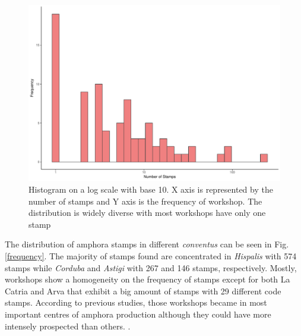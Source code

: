 \documentclass[review]{elsarticle}
\newcommand{\memo}[2]{\textcolor{#1}{#2}}
\newcommand{\xavi}[1]{\memo{magenta}{XRC: #1\\}}
\begin{document}

\begin{figure}[htp]
	\centering
\includegraphics[width=\linewidth]{figs/frequencystamp.pdf}
\caption{Histogram on a log scale with base 10. X axis is represented by the number of stamps and Y axis is the frequency of workshop. The distribution is widely diverse with most workshops have only one stamp}
\label{stamps}
\end{figure} 



The distribution of amphora stamps in different \textit{conventus} can be seen in Fig. \ref{frequency}. The majority of stamps found are concentrated in \textit{Hispalis} with 574 stamps while \textit{Corduba} and \textit{Astigi} with 267 and 146 stamps, respectively. Mostly, workshops show a homogeneity on the frequency of stamps except for both La Catria and Arva that exhibit a big amount of stamps with 29 different code stamps. According to previous studies, those workshops became in most important centres of amphora production although they could have more intensely prospected than others. \citep{arva_1997}.
 
\end{document}
